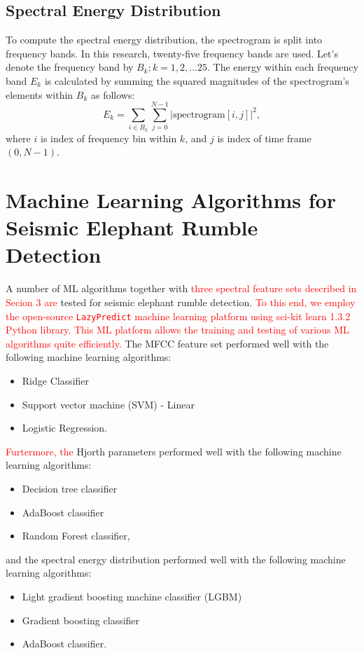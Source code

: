\documentclass[applsci,article,accept,moreauthors,pdftex]{Definitions/mdpi}
\begin{document}
\subsection{Spectral Energy Distribution}
To compute the spectral energy distribution, the spectrogram is split into frequency bands. In this research, twenty-five frequency bands are used. Let's denote the frequency band by $B_k;k=1,2,...25$. The energy within each frequency band $E_k$ is calculated by summing the squared magnitudes of the spectrogram's elements within $B_k$ as follows:
\begin{equation}
	E_k = \sum_{i\in B_k} \sum_{j=0}^{N-1} |\text{spectrogram}[i, j]|^2,
\end{equation}
where $i$ is index of frequency bin within $k$, and $j$ is index of time frame $(0,N-1)$.

\section{Machine Learning Algorithms for Seismic Elephant Rumble Detection}
A number of ML algorithms together with \textcolor{red}{three spectral feature sets described in Secion 3 are} tested for seismic elephant rumble detection. \textcolor{red}{To this end, we employ the open-source {\tt LazyPredict} machine learning platform using sci-kit learn 1.3.2 \cite{scikit-learn} Python library. This ML platform allows the training and testing of various ML algorithms quite efficiently.} The MFCC feature set performed well with the following machine learning algorithms:
\begin{itemize}
	\item{Ridge Classifier}
	\item{Support vector machine (SVM) - Linear}
	\item{Logistic Regression.}
\end{itemize}
\textcolor{red}{Furtermore, the} Hjorth parameters performed well with the following machine learning algorithms:
\begin{itemize}
	\item{Decision tree classifier}
	\item{AdaBoost classifier}
	\item{Random Forest classifier,}
\end{itemize}
and the spectral energy distribution performed well with the following machine learning algorithms:
\begin{itemize}
	\item{Light gradient boosting machine classifier (LGBM)}
	\item{Gradient boosting classifier}
	\item{AdaBoost classifier.}
\end{itemize}
\end{document}
